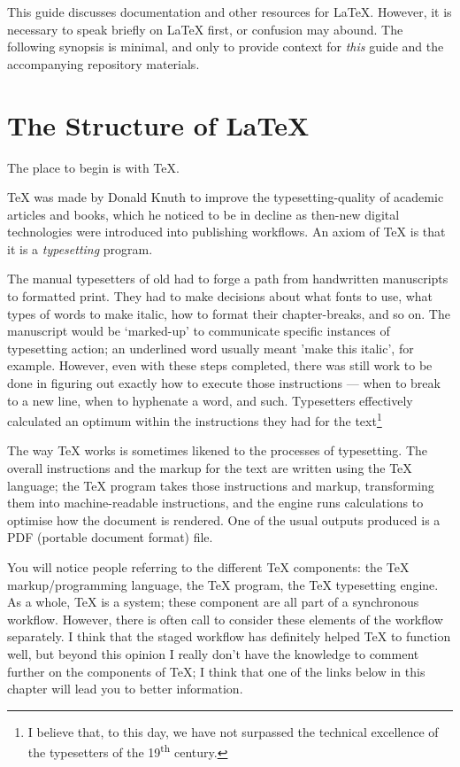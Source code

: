 \documentclass[11pt, oneside]{memoir}
\begin{document}
This guide discusses documentation and other resources for LaTeX. However, it is necessary to speak briefly on LaTeX first, or confusion may abound. The following synopsis is minimal, and only to provide context for \emph{this} guide and the accompanying repository materials.

\section{The Structure of \LaTeX{}}

The place to begin is with \TeX{}.

TeX was made by Donald Knuth to improve the typesetting-quality of academic articles and books, which he noticed to be in decline as then-new digital technologies were introduced into publishing workflows. An axiom of \TeX{} is that it is a \emph{typesetting} program. 

The manual typesetters of old had to forge a path from handwritten manuscripts to formatted print. They had to make decisions about what fonts to use, what types of words to make italic, how to format their chapter-breaks, and so on. The manuscript would be `marked-up' to communicate specific instances of typesetting action; an underlined word usually meant 'make this italic', for example. However, even with these steps completed, there was still work to be done in figuring out exactly how to execute those instructions — when to break to a new line, when to hyphenate a word, and such. Typesetters effectively calculated an optimum within the instructions they had for the text\footnote{I believe that, to this day, we have not surpassed the technical excellence of the typesetters of the 19\textsuperscript{th} century.}

The way TeX works is sometimes likened to the processes of typesetting. The overall instructions and the markup for the text are written using the TeX language; the TeX program takes those instructions and markup, transforming them into machine-readable instructions, and the engine runs calculations to optimise how the document is rendered. One of the usual outputs produced is a PDF (portable document format) file.

You will notice people referring to the different TeX components: the TeX markup/programming language, the TeX program, the TeX typesetting engine. As a whole, TeX is a system; these component are all part of a synchronous workflow. However, there is often call to consider these elements of the workflow separately. I think that the staged workflow has definitely helped TeX to function well, but beyond this opinion I really don't have the knowledge to comment further on the components of TeX; I think that one of the links below in this chapter will lead you to better information.
\end{document}
